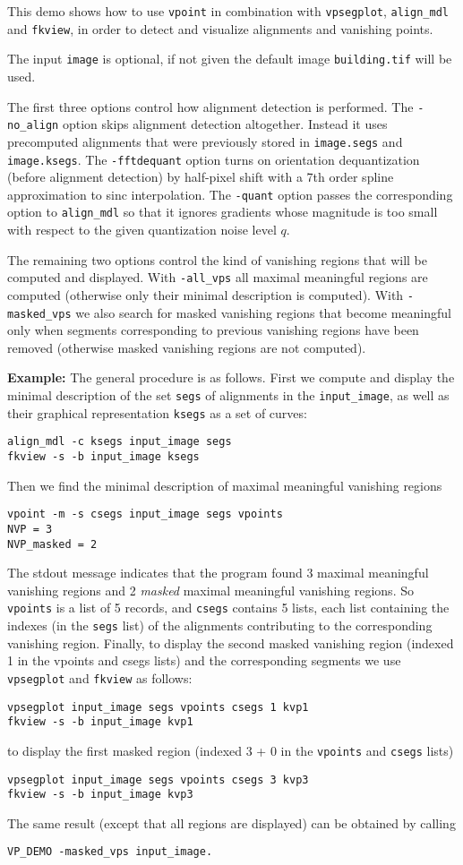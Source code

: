 This demo shows how to use \verb+vpoint+ in combination with \verb+vpsegplot+, \verb+align_mdl+ and \verb+fkview+, in order to detect and visualize alignments and vanishing points.

The input \verb+image+ is optional, if not given the default image \verb+building.tif+ will be used.

The first three options control how alignment detection is performed. The \verb+-no_align+ option skips alignment detection altogether. Instead it uses precomputed alignments that were previously stored in \verb+image.segs+ and \verb+image.ksegs+. The \verb+-fftdequant+ option turns on orientation dequantization (before alignment detection) by half-pixel shift with a 7th order spline approximation to sinc interpolation. The \verb+-quant+ option passes the corresponding option to \verb+align_mdl+ so that it ignores gradients whose magnitude is too small with respect to the given quantization noise level $q$.

The remaining two options control the kind of vanishing regions that will be computed and displayed. With \verb+-all_vps+ all maximal meaningful regions are computed (otherwise only their minimal description is computed). With \verb+-masked_vps+ we also search for masked vanishing regions that become meaningful only when segments corresponding to previous vanishing regions have been removed (otherwise masked vanishing regions are not computed).

{\bf Example:}
The general procedure is as follows.
First we compute and display the minimal description of the set \verb+segs+ of alignments in the \verb+input_image+, as well as their graphical representation \verb+ksegs+ as a set of curves:
\begin{verbatim}
align_mdl -c ksegs input_image segs
fkview -s -b input_image ksegs
\end{verbatim}
Then we find the minimal description of maximal meaningful vanishing regions
\begin{verbatim}
vpoint -m -s csegs input_image segs vpoints
NVP = 3
NVP_masked = 2
\end{verbatim}
The stdout message indicates that the program found 3 maximal meaningful vanishing regions and 2 \emph{masked} maximal meaningful vanishing regions. So \verb+vpoints+ is a list of 5 records, and \verb+csegs+ contains 5 lists, each list containing the indexes (in the \verb+segs+ list) of the alignments contributing to the corresponding vanishing region.
Finally, to display the second masked vanishing region (indexed 1 in the vpoints and csegs lists) and the corresponding segments we use \verb+vpsegplot+ and \verb+fkview+ as follows:
\begin{verbatim}
vpsegplot input_image segs vpoints csegs 1 kvp1
fkview -s -b input_image kvp1
\end{verbatim}
to display the first masked region (indexed 3 + 0 in the \verb+vpoints+ and \verb+csegs+ lists)
\begin{verbatim}
vpsegplot input_image segs vpoints csegs 3 kvp3
fkview -s -b input_image kvp3
\end{verbatim}

The same result (except that all regions are displayed) can be obtained by calling
\begin{verbatim}
VP_DEMO -masked_vps input_image.
\end{verbatim}

